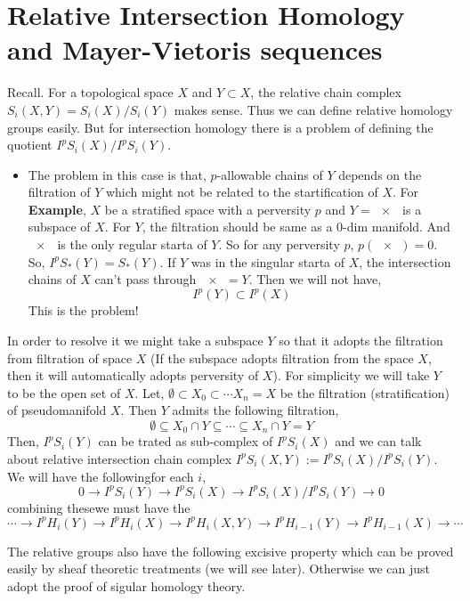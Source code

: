 \documentclass[11pt]{article}
\begin{document}
  \section{Relative Intersection Homology and Mayer-Vietoris sequences}

  Recall. For a topological space $X$ and $Y \subset X$, the relative chain complex $S_i(X,Y) = S_i(X)/S_i(Y)$ makes sense. Thus we can define relative homology groups easily. But for intersection homology there is a problem of defining the quotient $I^pS_i(X)/I^pS_i(Y)$. 
  \begin{itemize}
    \item[] The problem in this case is that, $p$-allowable chains of $Y$ depends on the filtration of $Y$ which might not be related to the startification of $X$. For \textbf{Example}, $X$ be a stratified space with a perversity $p$ and $Y =\qty{x}$ is a subspace of $X$. For $Y$, the filtration should be same as a $0$-dim manifold. And $\qty{x}$ is the only regular starta of $Y$. So for any perversity $p$, $p(\qty{x})=0$. So, $I^pS_{\ast}(Y) = S_{\ast}(Y)$. If $Y$ was in the singular starta of $X$, the intersection chains of $X$ can't pass through $\qty{x}=Y$. Then we will not have, \[I^p(Y)\subset I^p(X)\]
    This is the problem!
  \end{itemize}
In order to resolve it we might take a subspace $Y$ so that it adopts the filtration from filtration of space $X$ (If the subspace adopts filtration from the space $X$, then it will automatically adopts perversity of $X$). For simplicity we will take $Y$ to be the open set of $X$. Let, $\emptyset \subset X_0 \subset \cdots X_n=X$ be the filtration (stratification) of pseudomanifold $X$. Then $Y$ admits the following filtration, \[\emptyset \subseteq X_0\cap Y \subseteq \cdots \subseteq X_n\cap Y=Y\]
Then, $I^pS_i(Y)$ can be trated as sub-complex of $I^pS_i(X)$ and we can talk about relative intersection chain complex $I^pS_i(X,Y) := I^pS_i(X)/I^pS_i(Y)$. We will have the following\ess for each $i$, \[0 \to I^pS_i(Y) \to I^pS_i(X) \to I^pS_i(X)/I^pS_i(Y)\to 0\] \cite{GM_1990} combining these\ess we must have the\les   \[\cdots \to I^pH_i(Y) \to I^pH_i(X) \to I^pH_i(X,Y) \to I^pH_{i-1}(Y)\to I^pH_{i-1}(X)\to \cdots\]

\noindent The relative groups also have the following excisive property which can be proved easily by sheaf theoretic treatments (we will see later). Otherwise we can just adopt the proof of sigular homology theory.

\vspace*{0.2cm}
\end{document}
